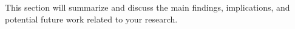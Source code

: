 \documentclass[
thesis.tex
]{subfiles}
\begin{document}
	
	This section will summarize and discuss the main findings, implications, and potential future work related to your research.
	
\end{document}
